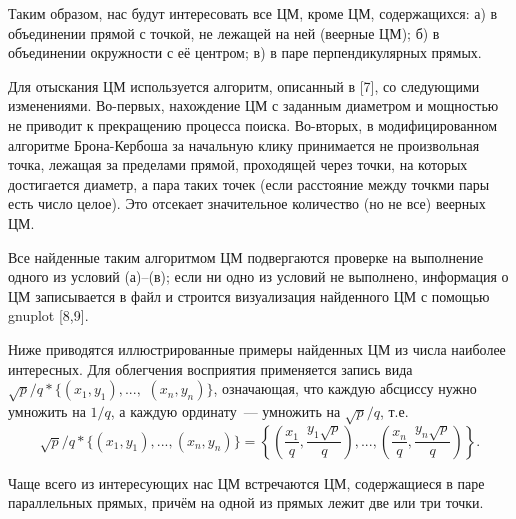 \documentclass[12pt]{article}
\begin{document}
Таким образом, нас будут интересовать все ЦМ, кроме ЦМ, содержащихся:
а) в объединении прямой с точкой, не лежащей на ней (веерные ЦМ);
б) в объединении окружности с её центром;
в) в паре перпендикулярных прямых.

Для отыскания ЦМ используется алгоритм, описанный в [7],
со следующими изменениями.
Во-первых, нахождение ЦМ с заданным диаметром и мощностью не приводит к прекращению процесса поиска.
Во-вторых, в модифицированном алгоритме Брона-Кербоша за начальную клику
принимается не произвольная точка, лежащая за пределами прямой, проходящей через точки,
на которых достигается диаметр, а пара таких точек (если расстояние между точкми пары есть число целое).
Это отсекает значительное количество (но не все) веерных ЦМ.

Все найденные таким алгоритмом ЦМ подвергаются проверке на выполнение одного из условий (а)--(в);
если ни одно из условий не выполнено, информация о ЦМ записывается в файл и строится визуализация найденного ЦМ с помощью gnuplot
[8,9].

Ниже приводятся иллюстрированные примеры найденных ЦМ из числа наиболее интересных.
Для облегчения восприятия применяется запись вида
$\sqrt{p}/q * \{ (x_1,y_1), ...,$ $ (x_n, y_n)  \}$,
означающая, что каждую абсциссу нужно умножить на $1/q$,
а каждую ординату~--- умножить на $\sqrt{p}/q$, т.е.
$$
	\sqrt{p}/q * \{ (x_1,y_1), ..., (x_n, y_n)  \}
	=
	\left\{ \left(\frac{x_1}{q},\frac{y_1\sqrt{p}}{q}\right), ..., \left(\frac{x_n}{q},\frac{y_n\sqrt{p}}{q}\right)  \right\}
	.
$$

Чаще всего из интересующих нас ЦМ встречаются ЦМ, содержащиеся в паре параллельных прямых,
причём на одной из прямых лежит две или три точки.
\end{document}
